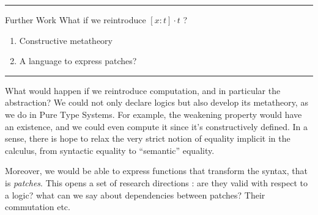 \documentclass[ignorenonframetext,red]{beamer}
\begin{document}
\hrule
\begin{frame}{Further Work}
  \Large
What if we reintroduce {\Huge $[x:t]\cdot t$} ?
\begin{enumerate} \normalsize
\pause
\item Constructive metatheory
\pause
\item A language to express patches?
\end{enumerate}
\end{frame}
\hrule

What would happen if we reintroduce computation, and in particular the
abstraction? We could not only declare logics but also develop its
metatheory, as we do in Pure Type Systems. For example, the weakening
property would have an existence, and we could even compute it since
it's constructively defined. In a sense, there is hope to relax the
very strict notion of equality implicit in the calculus, from
syntactic equality to ``semantic'' equality.

Moreover, we would be able to express functions that transform the
syntax, that is \emph{patches}. This opens a set of research
directions : are they valid with respect to a logic? what can we say
about dependencies between patches? Their commutation etc.
\end{document}
